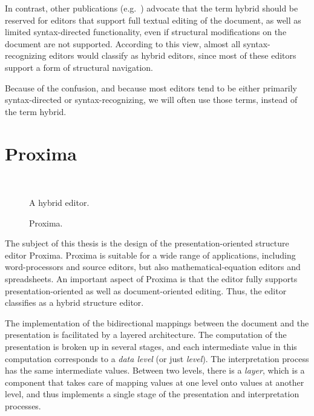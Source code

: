 In contrast, other publications (e.g.~\cite{ballance92pan, koorn92gse}) advocate that the term hybrid should be reserved for editors that support full textual editing of the document, as well as limited syntax-directed functionality, even if structural modifications on the document are not supported. According to this view, almost all syntax-recognizing editors would classify as hybrid editors, since most of these editors support a form of structural navigation.

Because of the confusion, and because most editors tend to be either primarily syntax-directed or syntax-recognizing, we will often use those terms, instead of the term hybrid.


\section{Proxima} \label{sect:introProxima}

\begin{figure}
\begin{minipage}[b]{.47\textwidth}
    \begin{center}   
~~
\vspace{56.4pt}
      \caption{A hybrid editor.}\label{hybridEditor} 
    \end{center}
  \end{minipage}
\hfill
\begin{minipage}[b]{.47\textwidth}
    \begin{center}  
\hspace*{0.5cm}
      \caption{Proxima.}\label{proximaEditor} 
    \end{center}
  \end{minipage}
\end{figure}


The subject of this thesis is the design of the presentation-oriented structure editor Proxima. Proxima is suitable for a wide range of applications, including word-processors and source editors, but also mathematical-equation editors and spreadsheets. An important aspect of Proxima is that the editor fully supports presentation-oriented as well as document-oriented editing. Thus, the editor classifies as a hybrid structure editor.

The implementation of the bidirectional mappings between the document and the presentation is facilitated by a layered architecture. The computation of the presentation is broken up in several stages, and each intermediate value in this computation corresponds to a {\em data level} (or just {\em level}). The interpretation process has the same intermediate values. Between two levels, there is a {\em layer}, which is a component that takes care of mapping values at one level onto values at another level, and thus implements a single stage of the presentation and interpretation processes. 

